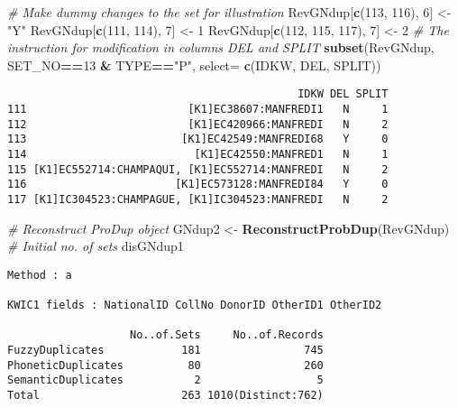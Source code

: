 \documentclass[]{article}
\newenvironment{Shaded}{\begin{snugshade}}{\end{snugshade}}
\newcommand{\CommentTok}[1]{\textcolor[rgb]{0.56,0.35,0.01}{\textit{#1}}}
\newcommand{\DataTypeTok}[1]{\textcolor[rgb]{0.13,0.29,0.53}{#1}}
\newcommand{\DecValTok}[1]{\textcolor[rgb]{0.00,0.00,0.81}{#1}}
\newcommand{\KeywordTok}[1]{\textcolor[rgb]{0.13,0.29,0.53}{\textbf{#1}}}
\newcommand{\NormalTok}[1]{#1}
\newcommand{\OperatorTok}[1]{\textcolor[rgb]{0.81,0.36,0.00}{\textbf{#1}}}
\newcommand{\StringTok}[1]{\textcolor[rgb]{0.31,0.60,0.02}{#1}}
\begin{document}
\begin{Shaded}
\begin{Highlighting}[]
\CommentTok{# Make dummy changes to the set for illustration}
\NormalTok{RevGNdup[}\KeywordTok{c}\NormalTok{(}\DecValTok{113}\NormalTok{, }\DecValTok{116}\NormalTok{), }\DecValTok{6}\NormalTok{] <-}\StringTok{ "Y"}
\NormalTok{RevGNdup[}\KeywordTok{c}\NormalTok{(}\DecValTok{111}\NormalTok{, }\DecValTok{114}\NormalTok{), }\DecValTok{7}\NormalTok{] <-}\StringTok{ }\DecValTok{1}
\NormalTok{RevGNdup[}\KeywordTok{c}\NormalTok{(}\DecValTok{112}\NormalTok{, }\DecValTok{115}\NormalTok{, }\DecValTok{117}\NormalTok{), }\DecValTok{7}\NormalTok{] <-}\StringTok{ }\DecValTok{2}
\CommentTok{# The instruction for modification in columns DEL and SPLIT}
\KeywordTok{subset}\NormalTok{(RevGNdup, SET_NO}\OperatorTok{==}\DecValTok{13} \OperatorTok{&}\StringTok{ }\NormalTok{TYPE}\OperatorTok{==}\StringTok{"P"}\NormalTok{, }\DataTypeTok{select=} \KeywordTok{c}\NormalTok{(IDKW, DEL, SPLIT))}
\end{Highlighting}
\end{Shaded}

\begin{verbatim}
                                             IDKW DEL SPLIT
111                         [K1]EC38607:MANFREDI1   N     1
112                         [K1]EC420966:MANFREDI   N     2
113                        [K1]EC42549:MANFREDI68   Y     0
114                          [K1]EC42550:MANFRED1   N     1
115 [K1]EC552714:CHAMPAQUI, [K1]EC552714:MANFREDI   N     2
116                       [K1]EC573128:MANFREDI84   Y     0
117 [K1]IC304523:CHAMPAGUE, [K1]IC304523:MANFREDI   N     2
\end{verbatim}

\begin{Shaded}
\begin{Highlighting}[]
\CommentTok{# Reconstruct ProDup object}
\NormalTok{GNdup2 <-}\StringTok{ }\KeywordTok{ReconstructProbDup}\NormalTok{(RevGNdup)}
\CommentTok{# Initial no. of sets}
\NormalTok{disGNdup1}
\end{Highlighting}
\end{Shaded}

\begin{verbatim}
Method : a

KWIC1 fields : NationalID CollNo DonorID OtherID1 OtherID2
 
                   No..of.Sets     No..of.Records
FuzzyDuplicates            181                745
PhoneticDuplicates          80                260
SemanticDuplicates           2                  5
Total                      263 1010(Distinct:762)
\end{verbatim}
\end{document}
